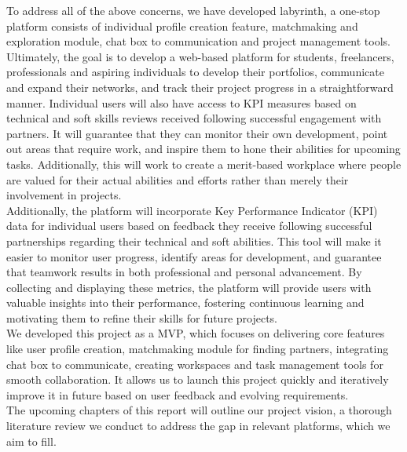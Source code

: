 \documentclass{FastFyp}
\begin{document}
To address all of the above concerns, we have developed labyrinth, a one-stop platform consists of individual profile creation feature, matchmaking and exploration module, chat box to communication and project management tools. Ultimately, the goal is to develop a web-based platform for students, freelancers, professionals and aspiring individuals to develop their portfolios, communicate and expand their networks, and track their project progress in a straightforward manner. Individual users will also have access to KPI measures based on technical and soft skills reviews received following successful engagement with partners.  It will guarantee that they can monitor their own development, point out areas that require work, and inspire them to hone their abilities for upcoming tasks.  Additionally, this will work to create a merit-based workplace where people are valued for their actual abilities and efforts rather than merely their involvement in projects.\\
Additionally, the platform will incorporate Key Performance Indicator (KPI) data for individual users based on feedback they receive following successful partnerships regarding their technical and soft abilities.  This tool will make it easier to monitor user progress, identify areas for development, and guarantee that teamwork results in both professional and personal advancement. By collecting and displaying these metrics, the platform will provide users with valuable insights into their performance, fostering continuous learning and motivating them to refine their skills for future projects. \\
We developed this project as a MVP, which focuses on delivering core features like user profile creation, matchmaking module for finding partners, integrating chat box to communicate, creating workspaces and task management tools for smooth collaboration. It allows us to launch this project quickly and iteratively improve it in future based on user feedback and evolving requirements.\\
The upcoming chapters of this report will outline our project vision, a thorough literature review we conduct to address the gap in relevant platforms, which we aim to fill.
\end{document}
